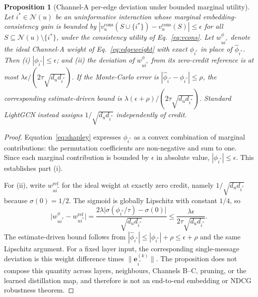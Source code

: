 \documentclass[a4paper,fleqn,longmktitle]{cas-dc}
\newtheorem{proposition}{Proposition}
\begin{document}
\begin{proposition}[Channel-A per-edge deviation under bounded marginal utility]
\label{prop:robust}
Let $i^\ast \in \mathcal{N}(u)$ be an uninformative interaction whose marginal embedding-consistency gain is bounded by
$|v_u^{\mathrm{cons}}(S \cup \{i^\ast\}) - v_u^{\mathrm{cons}}(S)| \le
\epsilon$ for all $S \subseteq \mathcal{N}(u) \setminus \{i^\ast\}$, under the
consistency utility of Eq.~\eqref{eq:vcons}. Let $w^{\phi}_{ui^\ast}$ denote
the ideal Channel-A weight of Eq.~\eqref{eq:edgeweight} with exact
$\phi_{i^\ast}$ in place of $\hat{\phi}_{i^\ast}$. Then (i)
$|\phi_{i^\ast}| \le \epsilon$; and (ii) the deviation of
$w^{\phi}_{ui^\ast}$ from its zero-credit reference is at most
$\lambda\epsilon / (2\tau\sqrt{d_u d_{i^\ast}})$. If the Monte-Carlo error is
$|\hat{\phi}_{i^\ast}-\phi_{i^\ast}|\le\rho$, the corresponding estimate-driven
bound is $\lambda(\epsilon+\rho)/(2\tau\sqrt{d_u d_{i^\ast}})$. Standard
LightGCN instead assigns $1/\sqrt{d_u d_{i^\ast}}$ independently of credit.
\end{proposition}

\begin{proof}
Equation~\eqref{eq:shapley} expresses $\phi_{i^\ast}$ as a convex combination
of marginal contributions: the permutation coefficients are non-negative and
sum to one. Since each marginal contribution is bounded by $\epsilon$ in
absolute value, $|\phi_{i^\ast}| \le \epsilon$. This establishes part (i).

For (ii), write $w^{\mathrm{ref}}_{ui^\ast}$ for the ideal weight at exactly
zero credit, namely
$1/\sqrt{d_u d_{i^\ast}}$ because $\sigma(0)=1/2$. The sigmoid is
globally Lipschitz with constant $1/4$, so
\begin{equation}
\bigl| w^{\phi}_{ui^\ast} - w^{\mathrm{ref}}_{ui^\ast} \bigr|
= \frac{2\lambda \bigl| \sigma(\phi_{i^\ast}/\tau) - \sigma(0) \bigr|}
       {\sqrt{d_u d_{i^\ast}}}
\le \frac{\lambda \epsilon}{2\tau \sqrt{d_u d_{i^\ast}}} .
\label{eq:weightgap}
\end{equation}
The estimate-driven bound follows from
$|\hat{\phi}_{i^\ast}|\le |\phi_{i^\ast}|+\rho\le\epsilon+\rho$ and the same
Lipschitz argument.
For a fixed layer input, the corresponding single-message deviation is this
weight difference times $\lVert \mathbf{e}_{i^\ast}^{(k)} \rVert$. The
proposition does not compose this quantity across layers, neighbours, Channels
B--C, pruning, or the learned distillation map, and therefore is not an
end-to-end embedding or NDCG robustness theorem.
\end{proof}
\end{document}
